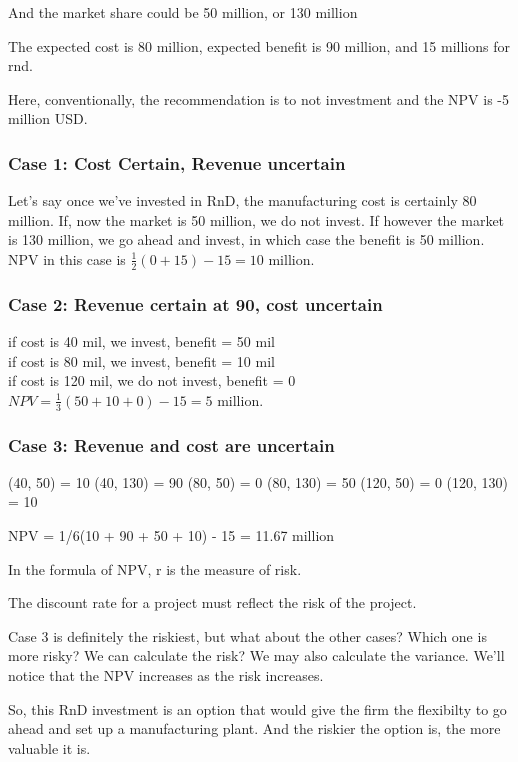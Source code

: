 \documentclass{article}
\begin{document}
And the market share could be 50 million, or 130 million

The expected cost is 80 million, expected benefit is 90 million, and 15 millions for rnd.

Here, conventionally, the recommendation is to not investment and the NPV is -5 million USD.

\subsubsection{Case 1: Cost Certain, Revenue uncertain}
Let's say once we've invested in RnD, the manufacturing cost is certainly 80 million. If, now the market is 50 million, we do not invest. If however the market is 130 million, we go ahead and invest, in which case the benefit is 50 million. NPV in this case is \(\frac{1}{2} (0+15) - 15 = 10\) million. 


\subsubsection{Case 2: Revenue certain at 90, cost uncertain}
 if cost is 40 mil, we invest, benefit = 50 mil \\
 if cost is 80 mil, we invest, benefit = 10 mil \\
 if cost is 120 mil, we do not invest, benefit = 0 \\

 \(NPV = \frac{1}{3}(50 + 10 + 0) - 15 = 5 \) million.


 \subsubsection{Case 3: Revenue and cost are uncertain}
 (40, 50) = 10
 (40, 130) = 90
 (80, 50) = 0
 (80, 130) = 50
 (120, 50) = 0
 (120, 130) = 10

 NPV = 1/6(10 + 90 + 50 + 10) - 15 = 11.67 million

 In the formula of NPV, r is the measure of risk.

 The discount rate for a project must reflect the risk of the project.

 Case 3 is definitely the riskiest, but what about the other cases? Which one is more risky?
 We can calculate the risk? We may also calculate the variance. We'll notice that the NPV increases as the risk increases.

So, this RnD investment is an option that would give the firm the flexibilty to go ahead and set up a manufacturing plant. And the riskier the option is, the more valuable it is.
\end{document}

